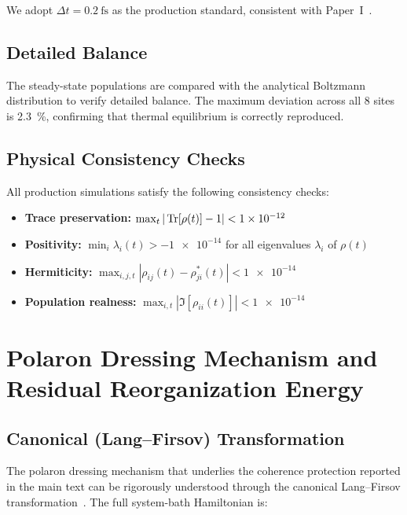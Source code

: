 \documentclass[11pt,a4paper]{article}
\begin{document}
We adopt $\Delta t = \SI{0.2}{\fs}$ as the production standard, consistent with Paper~I~\cite{Kouam2026}.

\subsection{Detailed Balance}

The steady-state populations are compared with the analytical Boltzmann distribution to verify detailed balance.
The maximum deviation across all 8 sites is \SI{2.3}{\percent}, confirming that thermal equilibrium is correctly reproduced.

\subsection{Physical Consistency Checks}

All production simulations satisfy the following consistency checks:
\begin{itemize}
\item \textbf{Trace preservation:} $\max_t |\Tr[\rho(t)] - 1| < \num{1e-12}$
\item \textbf{Positivity:} $\min_i \lambda_i(t) > -\num{1e-14}$ for all eigenvalues $\lambda_i$ of $\rho(t)$
\item \textbf{Hermiticity:} $\max_{i,j,t} |\rho_{ij}(t) - \rho_{ji}^*(t)| < \num{1e-14}$
\item \textbf{Population realness:} $\max_{i,t} |\Im[\rho_{ii}(t)]| < \num{1e-14}$
\end{itemize}


\section{Polaron Dressing Mechanism and Residual Reorganization Energy}
\label{SI-sec:polaron}

\subsection{Canonical (Lang--Firsov) Transformation}

The polaron dressing mechanism that underlies the coherence protection reported in the main text can be rigorously understood through the canonical Lang--Firsov transformation~\cite{Chin2013,Huelga2013}.
The full system-bath Hamiltonian is:
\end{document}
